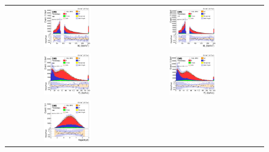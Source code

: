 \begin{figure}[ht]
  \begin{center}
    \begin{tabular}{ccc}
      \includegraphics[width=0.4\textwidth]{figures/tW/fig/Step2/ee/H_Mll.png}&
      \includegraphics[width=0.4\textwidth]{figures/tW/fig/Step2/mumu/H_Mll.png}\\
      \includegraphics[width=0.4\textwidth]{figures/tW/fig/Step2/ee/H_Ptll.png}&
      \includegraphics[width=0.4\textwidth]{figures/tW/fig/Step2/mumu/H_Ptll.png}\\
      \includegraphics[width=0.4\textwidth]{figures/tW/fig/Step2/ee/H_Rll.png}&

\end{tabular}
\end{center}
\end{figure}
